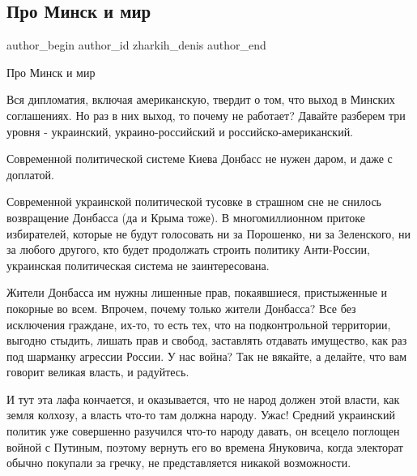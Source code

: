  
 
 
 
 
 
\subsection{Про Минск и мир}
\label{sec:22_01_2022.fb.zharkih_denis.1.pro_minsk_i_mir}
 
\ifcmt
 author_begin
   author_id zharkih_denis
 author_end
\fi

Про Минск и мир

Вся дипломатия, включая американскую, твердит о том, что выход в Минских
соглашениях. Но раз в них выход, то почему не работает? Давайте разберем три
уровня - украинский, украино-российский и российско-американский. 

Современной политической системе Киева Донбасс не нужен даром, и даже с
доплатой. 

Современной украинской политической тусовке в страшном сне не снилось
возвращение Донбасса (да и Крыма тоже). В многомиллионном притоке избирателей,
которые не будут голосовать ни за Порошенко, ни за Зеленского, ни за любого
другого, кто будет продолжать строить политику Анти-России, украинская
политическая система не заинтересована. 

Жители Донбасса им нужны лишенные прав, покаявшиеся, пристыженные и покорные во
всем. Впрочем, почему только жители Донбасса? Все без исключения граждане,
их-то, то есть тех, что на подконтрольной территории, выгодно стыдить, лишать
прав и свобод, заставлять отдавать имущество, как раз под шарманку агрессии
России. У нас война? Так не вякайте, а делайте, что вам говорит великая власть,
и радуйтесь.  

И тут эта лафа кончается, и оказывается, что не народ должен этой власти, как
земля колхозу, а власть что-то там должна народу. Ужас! Средний украинский
политик уже совершенно разучился что-то народу давать, он всецело поглощен
войной с Путиным, поэтому вернуть его во времена Януковича, когда электорат
обычно покупали за гречку, не представляется никакой возможности.  


